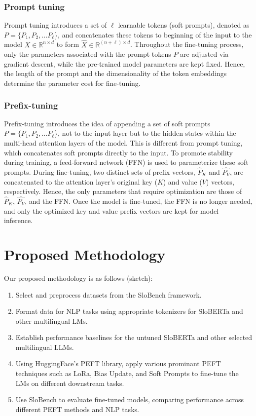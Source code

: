 \documentclass[fleqn,moreauthors,10pt]{ds_report}
\begin{document}
\subsubsection*{Prompt tuning}
Prompt tuning introduces a set of $\ell$ learnable tokens (soft prompts), denoted as $P =  \{P_1, P_2, \dots P_\ell$\},  and concatenates these tokens to beginning of the input to the model $X \in \mathbb{R}^{n\times d}$ to form $\hat{X} \in \mathbb{R}^{(n + \ell) \times d}$. Throughout the fine-tuning process, only the parameters associated with the prompt tokens $P$ are adjusted via gradient descent, while the pre-trained model parameters are kept fixed. Hence, the length of the prompt and the dimensionality of the token embeddings determine the parameter cost for fine-tuning.~\cite{prompt_tuning} 

\subsubsection*{Prefix-tuning}
Prefix-tuning introduces the idea of appending a set of soft prompts $P =  \{P_1, P_2, \dots P_\ell$\}, not to the input layer but to the hidden states within the multi-head attention layers of the model. This is different from prompt tuning, which concatenates  soft prompts directly to the input. To promote stability during training, a feed-forward network (FFN) is used to parameterize these soft prompts. During fine-tuning, two distinct sets of prefix vectors, $\hat{P}_K$ and $\hat{P_V}$, are concatenated to the attention layer's original key ($K$) and value ($V$) vectors, respectively. Hence, the only parameters that require optimization are those of $\hat{P}_K$, $\hat{P_V}$, and the FFN. Once the model is fine-tuned, the FFN is no longer needed, and only the optimized key and value prefix vectors are kept for model inference.~\cite{prefix_tuning}


\section{Proposed Methodology}
Our proposed methodology is as follows (sketch):
\begin{enumerate}
    \item Select and preprocess datasets from the SloBench framework.
    \item Format data for NLP tasks using appropriate tokenizers for SloBERTa and other multilingual LMs.
    \item Establish performance baselines for the untuned SloBERTa and other selected multilingual LLMs.
    \item Using HuggingFace's PEFT library, apply various prominant PEFT techniques such as LoRa, Bias Update, and Soft Prompts to fine-tune the LMs on different downstream tasks.
    \item Use SloBench to evaluate fine-tuned models, comparing performance across different PEFT methods and NLP tasks.
\end{enumerate}
\end{document}
